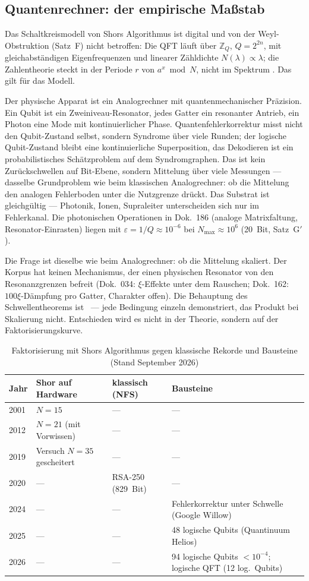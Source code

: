 \subsection{Quantenrechner: der empirische Maßstab}

Das Schaltkreismodell von Shors Algorithmus ist digital und von der
Weyl-Obstruktion (Satz~F) nicht betroffen: Die QFT läuft über $\mathbb{Z}_Q$,
$Q=2^{2n}$, mit gleichabständigen Eigenfrequenzen und linearer Zähldichte
$N(\lambda)\propto\lambda$; die Zahlentheorie steckt in der Periode $r$ von
$a^x \bmod N$, nicht im Spektrum \BM. Das gilt für das Modell.

Der physische Apparat ist ein Analogrechner mit quantenmechanischer Präzision.
Ein Qubit ist ein Zweiniveau-Resonator, jedes Gatter ein resonanter Antrieb,
ein Photon eine Mode mit kontinuierlicher Phase. Quantenfehlerkorrektur misst
nicht den Qubit-Zustand selbst, sondern Syndrome über viele Runden; der logische
Qubit-Zustand bleibt eine kontinuierliche Superposition, das Dekodieren ist ein
probabilistisches Schätzproblem auf dem Syndromgraphen. Das ist kein
Zurückschwellen auf Bit-Ebene, sondern Mittelung über viele Messungen ---
dasselbe Grundproblem wie beim klassischen Analogrechner: ob die Mittelung den
analogen Fehlerboden unter die Nutzgrenze drückt. Das Substrat ist gleichgültig
--- Photonik, Ionen, Supraleiter unterscheiden sich nur im Fehlerkanal. Die
photonischen Operationen in Dok.~186 (analoge Matrixfaltung, Resonator-Einrasten)
liegen mit $\varepsilon = 1/Q \approx 10^{-6}$ bei $N_\mathrm{max}\approx10^{6}$
(20~Bit, Satz~G$'$).

Die Frage ist dieselbe wie beim Analogrechner: ob die Mittelung skaliert. Der
Korpus hat keinen Mechanismus, der einen physischen Resonator von den
Resonanzgrenzen befreit (Dok.~034: $\xi$-Effekte unter dem Rauschen; Dok.~162:
$100\xi$-Dämpfung pro Gatter, Charakter offen). Die Behauptung des
Schwellentheorems ist \SM\ --- jede Bedingung einzeln demonstriert, das Produkt
bei Skalierung nicht. Entschieden wird es nicht in der Theorie, sondern auf der
Faktorisierungskurve.

\begin{table}[H]
\centering
\caption{Faktorisierung mit Shors Algorithmus gegen klassische Rekorde und Bausteine (Stand September 2026)}
\begin{tabular}{llll}
\toprule
Jahr & Shor auf Hardware & klassisch (NFS) & Bausteine \\
\midrule
2001 & $N=15$ & --- & --- \\
2012 & $N=21$ (mit Vorwissen) & --- & --- \\
2019 & Versuch $N=35$ gescheitert & --- & --- \\
2020 & --- & RSA-250 (829~Bit) & --- \\
2024 & --- & --- & Fehlerkorrektur unter Schwelle (Google Willow) \\
2025 & --- & --- & 48 logische Qubits (Quantinuum Helios) \\
2026 & --- & --- & 94 logische Qubits $<10^{-4}$; logische QFT (12 log.\ Qubits) \\
\bottomrule
\end{tabular}
\end{table}

